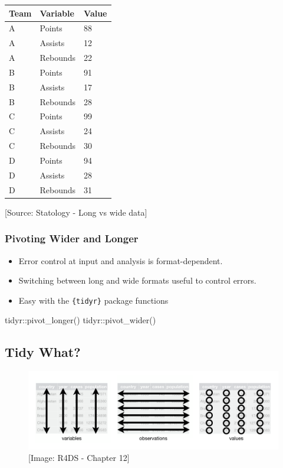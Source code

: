 \documentclass[
  letterpaper,
  DIV=11,
  numbers=noendperiod]{scrreprt}
\newenvironment{Shaded}{\begin{snugshade}}{\end{snugshade}}
\newcommand{\FunctionTok}[1]{\textcolor[rgb]{0.28,0.35,0.67}{#1}}
\newcommand{\NormalTok}[1]{\textcolor[rgb]{0.00,0.23,0.31}{#1}}
\newcommand{\SpecialCharTok}[1]{\textcolor[rgb]{0.37,0.37,0.37}{#1}}
\begin{document}
\begin{longtable}[]{@{}lll@{}}
\toprule\noalign{}
Team & Variable & Value \\
\midrule\noalign{}
\endhead
\bottomrule\noalign{}
\endlastfoot
A & Points & 88 \\
A & Assists & 12 \\
A & Rebounds & 22 \\
B & Points & 91 \\
B & Assists & 17 \\
B & Rebounds & 28 \\
C & Points & 99 \\
C & Assists & 24 \\
C & Rebounds & 30 \\
D & Points & 94 \\
D & Assists & 28 \\
D & Rebounds & 31 \\
\end{longtable}

{[}Source: Statology - Long vs wide data{]}

\subsubsection{Pivoting Wider and
Longer}\label{pivoting-wider-and-longer}

\begin{itemize}
\item
  Error control at input and analysis is format-dependent.
\item
  Switching between long and wide formats useful to control errors.
\item
  Easy with the \texttt{\{tidyr\}} package functions
\end{itemize}

\begin{Shaded}
\begin{Highlighting}[]
\NormalTok{tidyr}\SpecialCharTok{::}\FunctionTok{pivot\_longer}\NormalTok{()}
\NormalTok{tidyr}\SpecialCharTok{::}\FunctionTok{pivot\_wider}\NormalTok{()}
\end{Highlighting}
\end{Shaded}

\subsection{Tidy What?}\label{tidy-what}

\begin{figure}[H]

{\centering \includegraphics{images/201-tabular-data/tidy-1.png}

}

\caption{{[}Image: R4DS - Chapter 12{]}}

\end{figure}%
\end{document}
